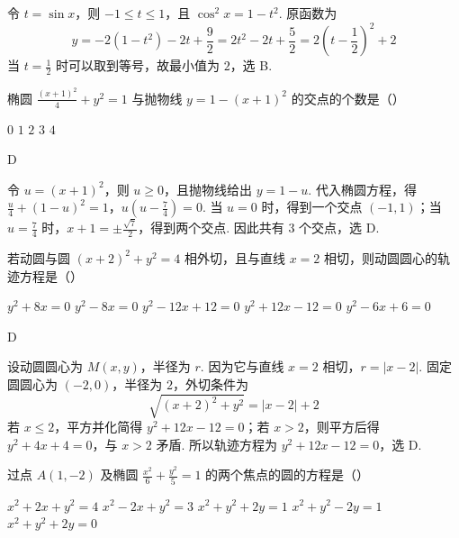 \begin{solution}
令 \(t=\sin x\)，则 \(-1\leq t\leq1\)，且 \(\cos^2x=1-t^2\). 原函数为
\[
y=-2(1-t^2)-2t+\frac{9}{2}=2t^2-2t+\frac{5}{2}=2\left(t-\frac{1}{2}\right)^2+2
\]
当 \(t=\frac{1}{2}\) 时可以取到等号，故最小值为 \(2\)，选 B.
\end{solution}


\begin{problem}

椭圆 \(\frac{(x + 1)^2}{4} + y^2 = 1\) 与抛物线 \(y = 1 - (x + 1)^2\) 的交点的个数是（\quad）

\choicesfive
    {\(0\)}
    {\(1\)}
    {\(2\)}
    {\(3\)}
    {\(4\)}
\end{problem}

\begin{answer}
D
\end{answer}

\begin{solution}
令 \(u=(x+1)^2\)，则 \(u\geq0\)，且抛物线给出 \(y=1-u\). 代入椭圆方程，得
\(\frac{u}{4}+(1-u)^2=1\)，\(u\left(u-\frac{7}{4}\right)=0\).
当 \(u=0\) 时，得到一个交点 \((-1,1)\)；当 \(u=\frac{7}{4}\) 时，\(x+1=\pm\frac{\sqrt{7}}{2}\)，得到两个交点. 因此共有 \(3\) 个交点，选 D.
\end{solution}


\begin{problem}

若动圆与圆 \((x+2)^{2}+y^{2}=4 \) 相外切，且与直线 \(x=2\) 相切，则动圆圆心的轨迹方程是（\quad）

\choicesfive
    {\(y^{2} + 8x = 0 \)}
    {\(y^{2}-8x=0 \)}
    {\(y^{2}-12x+12=0 \)}
    {\(y^{2} + 12x - 12 = 0 \)}
    {\(y^{2}-6x+6=0 \)}
\end{problem}

\begin{answer}
D
\end{answer}

\begin{solution}
设动圆圆心为 \(M(x,y)\)，半径为 \(r\). 因为它与直线 \(x=2\) 相切，\(r=|x-2|\). 固定圆圆心为 \((-2,0)\)，半径为 \(2\)，外切条件为
\[
\sqrt{(x+2)^2+y^2}=|x-2|+2
\]
若 \(x\leq2\)，平方并化简得 \(y^2+12x-12=0\)；若 \(x>2\)，则平方后得 \(y^2+4x+4=0\)，与 \(x>2\) 矛盾. 所以轨迹方程为 \(y^2+12x-12=0\)，选 D.
\end{solution}


\begin{problem}

过点 \(A(1, -2)\) 及椭圆 \(\frac{x^2}{6} + \frac{y^2}{5} = 1\) 的两个焦点的圆的方程是（\quad）

\choicesfive
    {\(x^{2} + 2x + y^{2} = 4\)}
    {\(x^{2} - 2x + y^{2} = 3\)}
    {\(x^{2} + y^{2} + 2y = 1\)}
    {\(x^{2} + y^{2} - 2y = 1\)}
    {\(x^{2} + y^{2} + 2y = 0\)}
\end{problem}

